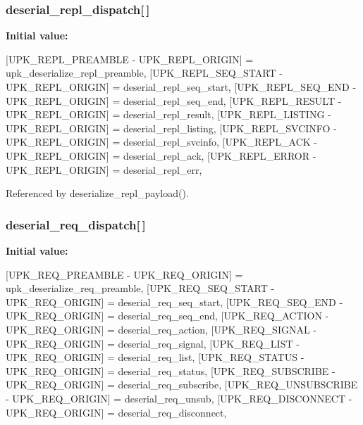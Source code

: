 \subsubsection[{deserial\_\-repl\_\-dispatch}]{ {\bf deserial\_\-repl\_\-dispatch}[$\,$]\hspace{0.3cm}{\ttfamily  [static]}}\label{upk__v0__protocol__serializer_8c_a835df861d1f4ad5654ede65cb3d41658}
{\bfseries Initial value:}
\begin{DoxyCode}
 {
    [UPK_REPL_PREAMBLE - UPK_REPL_ORIGIN] = upk_deserialize_repl_preamble,
    [UPK_REPL_SEQ_START - UPK_REPL_ORIGIN] = deserial_repl_seq_start,
    [UPK_REPL_SEQ_END - UPK_REPL_ORIGIN] = deserial_repl_seq_end,
    [UPK_REPL_RESULT - UPK_REPL_ORIGIN] = deserial_repl_result,
    [UPK_REPL_LISTING - UPK_REPL_ORIGIN] = deserial_repl_listing,
    [UPK_REPL_SVCINFO - UPK_REPL_ORIGIN] = deserial_repl_svcinfo,
    [UPK_REPL_ACK - UPK_REPL_ORIGIN] = deserial_repl_ack,
    [UPK_REPL_ERROR - UPK_REPL_ORIGIN] = deserial_repl_err,
}
\end{DoxyCode}


Referenced by deserialize\_\-repl\_\-payload().

\subsubsection[{deserial\_\-req\_\-dispatch}]{ {\bf deserial\_\-req\_\-dispatch}[$\,$]\hspace{0.3cm}{\ttfamily  [static]}}\label{upk__v0__protocol__serializer_8c_a7374e093f0fbf29244bce257767cb7d9}
{\bfseries Initial value:}
\begin{DoxyCode}
 {
    [UPK_REQ_PREAMBLE - UPK_REQ_ORIGIN] = upk_deserialize_req_preamble,
    [UPK_REQ_SEQ_START - UPK_REQ_ORIGIN] = deserial_req_seq_start,
    [UPK_REQ_SEQ_END - UPK_REQ_ORIGIN] = deserial_req_seq_end,
    [UPK_REQ_ACTION - UPK_REQ_ORIGIN] = deserial_req_action,
    [UPK_REQ_SIGNAL - UPK_REQ_ORIGIN] = deserial_req_signal,
    [UPK_REQ_LIST - UPK_REQ_ORIGIN] = deserial_req_list,
    [UPK_REQ_STATUS - UPK_REQ_ORIGIN] = deserial_req_status,
    [UPK_REQ_SUBSCRIBE - UPK_REQ_ORIGIN] = deserial_req_subscribe,
    [UPK_REQ_UNSUBSCRIBE - UPK_REQ_ORIGIN] = deserial_req_unsub,
    [UPK_REQ_DISCONNECT - UPK_REQ_ORIGIN] = deserial_req_disconnect,
}
\end{DoxyCode}


